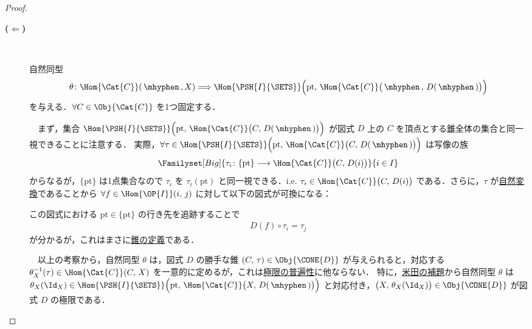 \documentclass[TQFT_main]{subfiles}
\begin{document}
\begin{proof}
    \begin{description}
        \item[\textbf{($\bm{\Longleftarrow}$)}]　
        
        自然同型
        \begin{align}
            \theta \colon \Hom{\Cat{C}}(\, \mhyphen \,, X) \Longrightarrow \Hom{\PSH{I}{\SETS}} \Bigl( \mathrm{pt},\, \Hom{\Cat{C}}\bigl(\, \mhyphen \,,\, D(\, \mhyphen \,) \bigr)  \Bigr)
        \end{align}
        を与える．$\forall C \in \Obj{\Cat{C}}$ を1つ固定する．
        
        　まず，集合 $\Hom{\PSH{I}{\SETS}} \Bigl( \mathrm{pt},\, \Hom{\Cat{C}}\bigl(C,\, D(\, \mhyphen \,) \bigr)  \Bigr)$ が図式 $D$ 上の $C$ を頂点とする\hyperref[def:Cone]{錐}全体の集合と同一視できることに注意する．
        実際，$\forall \tau \in \Hom{\PSH{I}{\SETS}} \Bigl( \mathrm{pt},\, \Hom{\Cat{C}}\bigl(C,\, D(\, \mhyphen \,) \bigr)  \Bigr)$
        は写像の族
        \begin{align}
            \Familyset[Big]{\tau_i \colon \{\mathrm{pt}\} \lto \Hom{\Cat{C}} \bigl( C,\, D(i) \bigr) }{i \in I}
        \end{align}
        からなるが，$\{\mathrm{pt}\}$ は1点集合なので $\tau_i$ を $\tau_i (\mathrm{pt})$ と同一視できる．i.e. $\tau_i \in \Hom{\Cat{C}} \bigl( C,\, D(i) \bigr)$ である．さらに，$\tau$ が\hyperref[def:nat]{自然変換}であることから
        $\forall f \in \Hom{\OP{I}}(i,\, j)$ に対して以下の図式が可換になる：
        \begin{center}
        \end{center}
        この図式における $\mathrm{pt} \in \{\mathrm{pt}\}$ の行き先を追跡することで
        \begin{align}
            D(f) \circ \tau_i = \tau_j
        \end{align}
        が分かるが，これはまさに\hyperref[def:Cone]{錐の定義}である．

        　以上の考察から，自然同型 $\theta$ は，図式 $D$ の勝手な錐 $(C,\, \tau) \in \Obj{\CONE{D}}$ が与えられると，対応する $\theta_X^{-1}(\tau) \in \Hom{\Cat{C}}(C,\, X)$ を一意的に定めるが，これは\hyperref[def:lim]{極限の普遍性}に他ならない．
        特に，\hyperref[lem:Yoneda]{米田の補題}から自然同型 $\theta$ は $\theta_X(\Id_X) \in \Hom{\PSH{I}{\SETS}} \Bigl( \mathrm{pt},\, \Hom{\Cat{C}}\bigl(X,\, D(\, \mhyphen \,) \bigr)  \Bigr)$ と対応付き，$\bigl( X,\, \theta_X(\Id_X) \bigr) \in \Obj{\CONE{D}}$ が図式 $D$ の極限である．


\end{description}
\end{proof}
\end{document}
